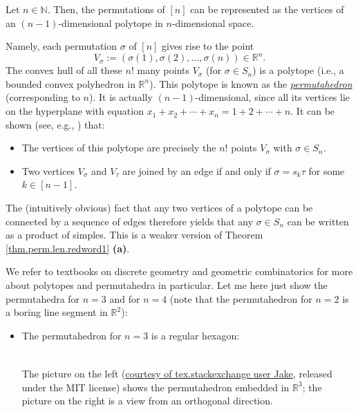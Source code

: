\begin{remark}
Let $n\in\mathbb{N}$. Then, the permutations of $\left[  n\right]  $ can be
represented as the vertices of an $\left(  n-1\right)  $-dimensional polytope
in $n$-dimensional space.

Namely, each permutation $\sigma$ of $\left[  n\right]  $ gives rise to the
point%
\[
V_{\sigma}:=\left(  \sigma\left(  1\right)  ,\sigma\left(  2\right)
,\ldots,\sigma\left(  n\right)  \right)  \in\mathbb{R}^{n}.
\]
The convex hull of all these $n!$ many points $V_{\sigma}$ (for $\sigma\in
S_{n}$) is a polytope (i.e., a bounded convex polyhedron in $\mathbb{R}^{n}$).
This polytope is known as the
\emph{\href{https://en.wikipedia.org/wiki/Permutohedron}{\emph{permutahedron}%
}} (corresponding to $n$). It is actually $\left(  n-1\right)  $-dimensional,
since all its vertices lie on the hyperplane with equation $x_{1}+x_{2}%
+\cdots+x_{n}=1+2+\cdots+n$. It can be shown (see, e.g., \cite{GaiGup77}) that:

\begin{itemize}
\item The vertices of this polytope are precisely the $n!$ points $V_{\sigma}$
with $\sigma\in S_{n}$.

\item Two vertices $V_{\sigma}$ and $V_{\tau}$ are joined by an edge if and
only if $\sigma=s_{k}\tau$ for some $k\in\left[  n-1\right]  $.
\end{itemize}

\noindent The (intuitively obvious) fact that any two vertices of a polytope
can be connected by a sequence of edges therefore yields that any $\sigma\in
S_{n}$ can be written as a product of simples. This is a weaker version of
Theorem \ref{thm.perm.len.redword1} \textbf{(a)}.

We refer to textbooks on discrete geometry and geometric combinatorics for
more about polytopes and permutahedra in particular. Let me here just show the
permutahedra for $n=3$ and for $n=4$ (note that the permutahedron for $n=2$ is
a boring line segment in $\mathbb{R}^{2}$):

\begin{itemize}
\item The permutahedron for $n=3$ is a regular hexagon:%
\[%
\begin{tabular}
[c]{ccc}%
$%
$ & $\ \ \ \ \ \ \ \ \ \ $ & $%
$%
\end{tabular}
\
\]
The picture on the left
(\href{https://tex.stackexchange.com/a/321238/}{courtesy of tex.stackexchange
user Jake}, released under the MIT license) shows the permutahedron embedded
in $\mathbb{R}^{3}$; the picture on the right is a view from an orthogonal direction.


\end{itemize}
\end{remark}

